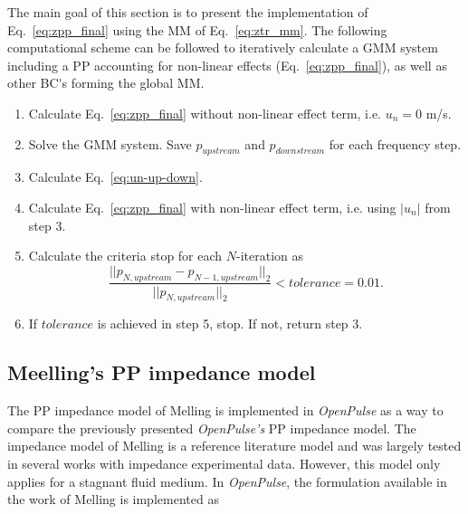 \documentclass[12pt]{article}
\begin{document}
%

The main goal of this section is to present the implementation of Eq.~\ref{eq:zpp_final} using the \acrshort{MM} of Eq.~\ref{eq:ztr_mm}. The following computational scheme can be followed to iteratively calculate a \acrshort{GMM} system including a \acrshort{PP} accounting for non-linear effects (Eq.~\ref{eq:zpp_final}), as well as other \acrshort{BC's} forming the global \acrshort{MM}.

\begin{enumerate}
	\item Calculate Eq.~\ref{eq:zpp_final} without non-linear effect term, i.e. $u_n= 0 $ m/s.
	\item Solve the \acrshort{GMM} system. Save $p_{upstream}$ and $p_{downstream}$ for each frequency step.
	\item Calculate Eq.~\ref{eq:un-up-down}.
	\item Calculate Eq.~\ref{eq:zpp_final} with non-linear effect term, i.e. using $|u_n|$ from step 3.
	\item Calculate the criteria stop for each $N$-iteration as
	\begin{equation} \label{eq:convergence_pp}
		\frac{|| p_{N , upstream}  -  p_{N-1,upstream} ||_2}{ || p_{N,upstream}||_2}  < tolerance = 0.01.
	\end{equation}
	\item If $tolerance$ is achieved in step 5, stop. If not, return step 3.
\end{enumerate}

\subsection{Meelling's \acrshort{PP} impedance model}

The \acrshort{PP} impedance model of Melling \cite{MELLING19731} is implemented in \textit{OpenPulse} as a way to compare the previously presented \textit{OpenPulse's} \acrshort{PP} impedance model. The impedance model of Melling is a reference literature model and was largely tested in several works with impedance experimental data. However, this model only applies for a stagnant fluid medium. In \textit{OpenPulse}, the formulation available in the work of Melling \cite{MELLING19731} is implemented as
\end{document}
